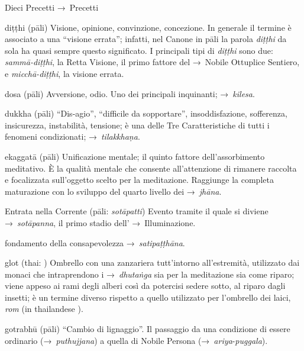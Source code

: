 \begin{glossarydescription}
\item[Dieci Precetti] →~Precetti

\item[diṭṭhi] (pāli) Visione, opinione, convinzione, concezione. In generale il
  termine è associato a una ``visione errata''; infatti, nel Canone in pāli la
  parola \emph{diṭṭhi} da sola ha quasi sempre questo significato. I principali
  tipi di \emph{diṭṭhi} sono due: \emph{sammā-diṭṭhi}, la Retta Visione, il
  primo fattore del →~Nobile Ottuplice Sentiero, e \emph{micchā-diṭṭhi}, la
  visione errata.

\item[dosa] (pāli) Avversione, odio. Uno dei principali inquinanti;
  →~\emph{kilesa}.

\item[dukkha] (pāli) ``Dis-agio'', ``difficile da sopportare'', insoddisfazione,
  sofferenza, insicurezza, instabilità, tensione; è una delle Tre
  Caratteristiche di tutti i fenomeni condizionati; →~\emph{tilakkhaṇa}.


\item[ekaggatā] (pāli) Unificazione mentale; il quinto fattore dell'assorbimento
  meditativo. È la qualità mentale che consente all'attenzione di rimanere
  raccolta e focalizzata sull'oggetto scelto per la meditazione. Raggiunge la
  completa maturazione con lo sviluppo del quarto livello dei →~\emph{jhāna}.

\item[Entrata nella Corrente] (pāli: \emph{sotāpatti}) Evento tramite il quale
  si diviene →~\emph{sotāpanna}, il primo stadio dell' →~Illuminazione.


\item[fondamento della consapevolezza] →~\emph{satipaṭṭhāna}.


\item[glot] (thai: ) Ombrello con una zanzariera tutt'intorno
  all'estremità, utilizzato dai monaci che intraprendono i →~\emph{dhutaṅga} sia
  per la meditazione sia come riparo; viene appeso ai rami degli alberi così da
  potercisi sedere sotto, al riparo dagli insetti; è un termine diverso rispetto
  a quello utilizzato per l'ombrello dei laici, \emph{rom} (in thailandese
  ).

\item[gotrabhū] (pāli) ``Cambio di lignaggio''. Il passaggio da una condizione
  di essere ordinario (→~\emph{puthujjana}) a quella di Nobile Persona
  (→~\emph{ariya}-\emph{puggala}).


\end{glossarydescription}
